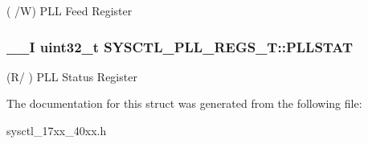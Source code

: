 ( /\+W) P\+L\+L Feed Register \hypertarget{struct_s_y_s_c_t_l___p_l_l___r_e_g_s___t_a9cc1486fbc5a9888ccdd70df2b57ebec}{
\subsubsection[{P\+L\+L\+S\+T\+A\+T}]{\setlength{\rightskip}{0pt plus 5cm}\+\_\+\+\_\+\+I uint32\+\_\+t S\+Y\+S\+C\+T\+L\+\_\+\+P\+L\+L\+\_\+\+R\+E\+G\+S\+\_\+\+T\+::\+P\+L\+L\+S\+T\+A\+T}}\label{struct_s_y_s_c_t_l___p_l_l___r_e_g_s___t_a9cc1486fbc5a9888ccdd70df2b57ebec}
(R/ ) P\+L\+L Status Register 

The documentation for this struct was generated from the following file\+:\begin{DoxyCompactItemize}
\item 
sysctl\+\_\+17xx\+\_\+40xx.\+h\end{DoxyCompactItemize}
